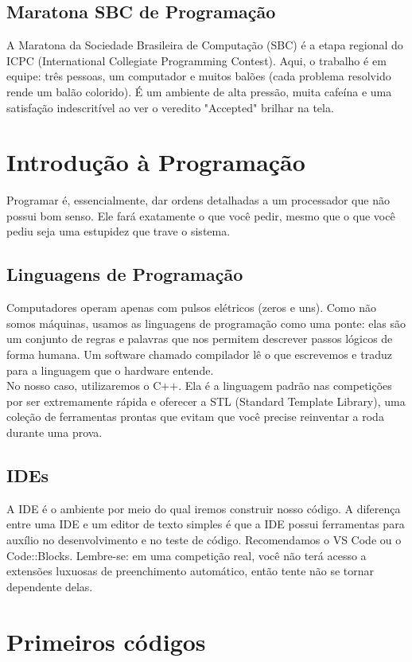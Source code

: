 \documentclass[12pt]{article}
\begin{document}
\subsection{Maratona SBC de Programação}
A Maratona da Sociedade Brasileira de Computação (SBC) é a etapa regional do ICPC (International Collegiate Programming Contest). Aqui, o trabalho é em equipe: três pessoas, um computador e muitos balões (cada problema resolvido rende um balão colorido). É um ambiente de alta pressão, muita cafeína e uma satisfação indescritível ao ver o veredito "Accepted" brilhar na tela.

\section{Introdução à Programação}
Programar é, essencialmente, dar ordens detalhadas a um processador que não possui bom senso. Ele fará exatamente o que você pedir, mesmo que o que você pediu seja uma estupidez que trave o sistema.

\subsection{Linguagens de Programação}
Computadores operam apenas com pulsos elétricos (zeros e uns). Como não somos máquinas, usamos as linguagens de programação como uma ponte: elas são um conjunto de regras e palavras que nos permitem descrever passos lógicos de forma humana. Um software chamado compilador lê o que escrevemos e traduz para a linguagem que o hardware entende.\\
No nosso caso, utilizaremos o C++. Ela é a linguagem padrão nas competições por ser extremamente rápida e oferecer a STL (Standard Template Library), uma coleção de ferramentas prontas que evitam que você precise reinventar a roda durante uma prova.

\subsection{IDEs}
A IDE é o ambiente por meio do qual iremos construir nosso código. A diferença entre uma IDE e um editor de texto simples é que a IDE possui ferramentas para auxílio no desenvolvimento e no teste de código. Recomendamos o VS Code ou o Code::Blocks. Lembre-se: em uma competição real, você não terá acesso a extensões luxuosas de preenchimento automático, então tente não se tornar dependente delas.

\section{Primeiros códigos}
\end{document}
